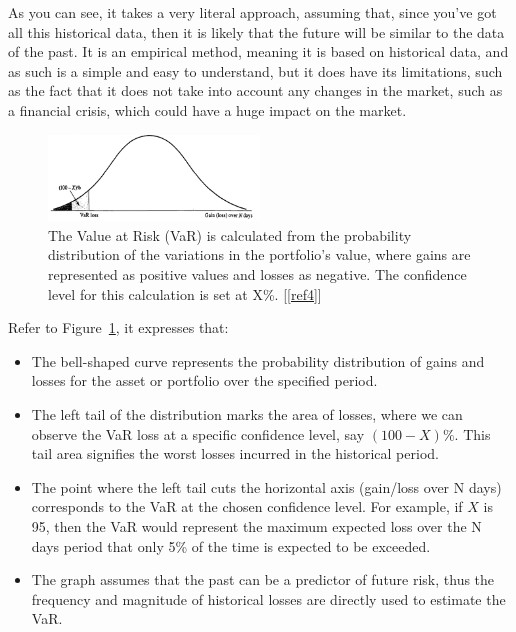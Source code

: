 \documentclass{article}
\begin{document}
As you can see, it takes a very literal approach, assuming that, since you've got all this historical data, then it is likely that the future will be similar to the data of the past. It is an empirical method, meaning it is based on historical data, and as such is a simple and easy to understand, but it does have its limitations, such as the fact that it does not take into account any changes in the market, such as a financial crisis, which could have a huge impact on the market.\\\vspace{0.3cm}

\begin{figure}[h]
  \centering
  \includegraphics[width=0.5\textwidth]{Images/Image 1.png}
  \caption{The Value at Risk (VaR) is calculated from the probability distribution of the variations in the portfolio's value, where gains are represented as positive values and losses as negative. The confidence level for this calculation is set at X\%. [\ref{ref4}]}
  \label{VaR Distribution Curve}
\end{figure}

Refer to Figure~\ref{VaR Distribution Curve}, it expresses that:  
\begin{itemize}
  \item The bell-shaped curve represents the probability distribution of gains and losses for the asset or portfolio over the specified period.
  
  \item The left tail of the distribution marks the area of losses, where we can observe the VaR loss at a specific confidence level, say \( (100 - X)\% \). This tail area signifies the worst losses incurred in the historical period.
  
  \item The point where the left tail cuts the horizontal axis (gain/loss over N days) corresponds to the VaR at the chosen confidence level. For example, if \( X \) is 95, then the VaR would represent the maximum expected loss over the N days period that only 5\% of the time is expected to be exceeded.
  
  \item The graph assumes that the past can be a predictor of future risk, thus the frequency and magnitude of historical losses are directly used to estimate the VaR.
\end{itemize}
\end{document}
